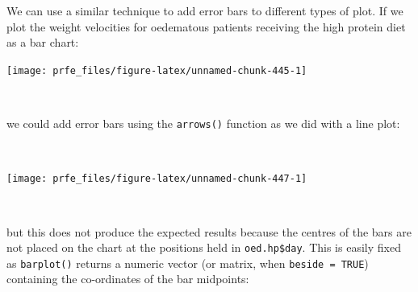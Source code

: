 \documentclass[12pt,a4paper]{book}
\newenvironment{Shaded}{\begin{snugshade}}{\end{snugshade}}
\newcommand{\KeywordTok}[1]{\textcolor[rgb]{0.13,0.29,0.53}{\textbf{#1}}}
\newcommand{\DataTypeTok}[1]{\textcolor[rgb]{0.13,0.29,0.53}{#1}}
\newcommand{\DecValTok}[1]{\textcolor[rgb]{0.00,0.00,0.81}{#1}}
\newcommand{\FloatTok}[1]{\textcolor[rgb]{0.00,0.00,0.81}{#1}}
\newcommand{\StringTok}[1]{\textcolor[rgb]{0.31,0.60,0.02}{#1}}
\newcommand{\OperatorTok}[1]{\textcolor[rgb]{0.81,0.36,0.00}{\textbf{#1}}}
\newcommand{\NormalTok}[1]{#1}
\theoremstyle{definition}
\theoremstyle{definition}
\theoremstyle{definition}
\theoremstyle{remark}
\begin{document}
We can use a similar technique to add error bars to different types of
plot. If we plot the weight velocities for oedematous patients receiving
the high protein diet as a bar chart:

\newpage

\begin{Shaded}
\end{Shaded}

\begin{center}\texttt{[image: prfe\_files/figure-latex/unnamed-chunk-445-1]} \end{center}

~

we could add error bars using the \texttt{arrows()} function as we did
with a line plot:

~

\begin{Shaded}
\end{Shaded}

\begin{center}\texttt{[image: prfe\_files/figure-latex/unnamed-chunk-447-1]} \end{center}

~

but this does not produce the expected results because the centres of
the bars are not placed on the chart at the positions held in
\texttt{oed.hp\$day}. This is easily fixed as \texttt{barplot()} returns
a numeric vector (or matrix, when \texttt{beside\ =\ TRUE}) containing
the co-ordinates of the bar midpoints:

\newpage
\end{document}
